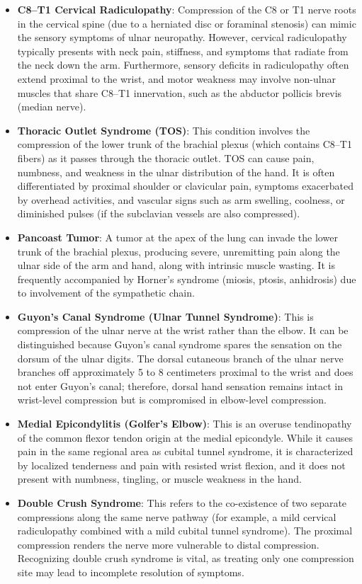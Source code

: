 \begin{itemize}
  \item \textbf{C8--T1 Cervical Radiculopathy}: Compression of the C8 or T1 nerve roots in the cervical spine (due to a herniated disc or foraminal stenosis) can mimic the sensory symptoms of ulnar neuropathy. However, cervical radiculopathy typically presents with neck pain, stiffness, and symptoms that radiate from the neck down the arm. Furthermore, sensory deficits in radiculopathy often extend proximal to the wrist, and motor weakness may involve non-ulnar muscles that share C8--T1 innervation, such as the abductor pollicis brevis (median nerve).
  \item \textbf{Thoracic Outlet Syndrome (TOS)}: This condition involves the compression of the lower trunk of the brachial plexus (which contains C8--T1 fibers) as it passes through the thoracic outlet. TOS can cause pain, numbness, and weakness in the ulnar distribution of the hand. It is often differentiated by proximal shoulder or clavicular pain, symptoms exacerbated by overhead activities, and vascular signs such as arm swelling, coolness, or diminished pulses (if the subclavian vessels are also compressed).
  \item \textbf{Pancoast Tumor}: A tumor at the apex of the lung can invade the lower trunk of the brachial plexus, producing severe, unremitting pain along the ulnar side of the arm and hand, along with intrinsic muscle wasting. It is frequently accompanied by Horner's syndrome (miosis, ptosis, anhidrosis) due to involvement of the sympathetic chain.
  \item \textbf{Guyon's Canal Syndrome (Ulnar Tunnel Syndrome)}: This is compression of the ulnar nerve at the wrist rather than the elbow. It can be distinguished because Guyon's canal syndrome spares the sensation on the dorsum of the ulnar digits. The dorsal cutaneous branch of the ulnar nerve branches off approximately 5 to 8 centimeters proximal to the wrist and does not enter Guyon's canal; therefore, dorsal hand sensation remains intact in wrist-level compression but is compromised in elbow-level compression.
  \item \textbf{Medial Epicondylitis (Golfer's Elbow)}: This is an overuse tendinopathy of the common flexor tendon origin at the medial epicondyle. While it causes pain in the same regional area as cubital tunnel syndrome, it is characterized by localized tenderness and pain with resisted wrist flexion, and it does not present with numbness, tingling, or muscle weakness in the hand.
  \item \textbf{Double Crush Syndrome}: This refers to the co-existence of two separate compressions along the same nerve pathway (for example, a mild cervical radiculopathy combined with a mild cubital tunnel syndrome). The proximal compression renders the nerve more vulnerable to distal compression. Recognizing double crush syndrome is vital, as treating only one compression site may lead to incomplete resolution of symptoms.

\end{itemize}
